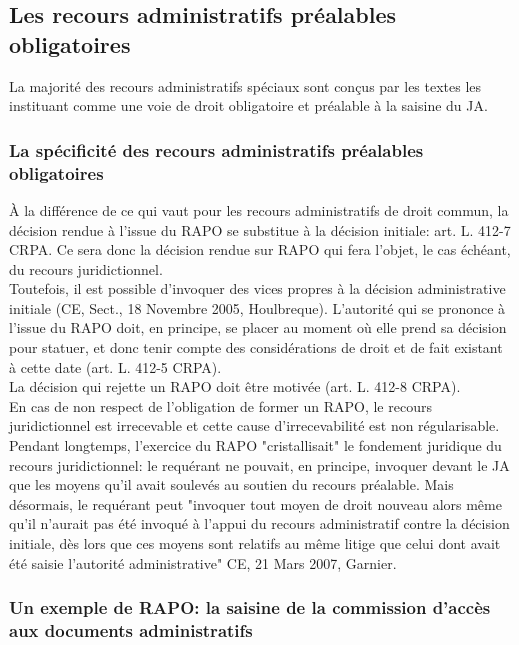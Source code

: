 \documentclass[10pt, a4paper, openany]{book}
\begin{document}
\subsection{Les recours administratifs préalables obligatoires}

La majorité des recours administratifs spéciaux sont conçus par les textes les instituant comme une voie de droit obligatoire et préalable à la saisine du JA. 

\subsubsection{La spécificité des recours administratifs préalables obligatoires}

À la différence de ce qui vaut pour les recours administratifs de droit commun, la décision rendue à l'issue du RAPO se substitue à la décision initiale: art. L. 412-7 CRPA. Ce sera donc la décision rendue sur RAPO qui fera l'objet, le cas échéant, du recours juridictionnel. \\
Toutefois, il est possible d'invoquer des vices propres à la décision administrative initiale (CE, Sect., 18 Novembre 2005, Houlbreque). L'autorité qui se prononce à l'issue du RAPO doit, en principe, se placer au moment où elle prend sa décision pour statuer, et donc tenir compte des considérations de droit et de fait existant à cette date (art. L. 412-5 CRPA). \\
La décision qui rejette un RAPO doit être motivée (art. L. 412-8 CRPA). \\
En cas de non respect de l'obligation de former un RAPO, le recours juridictionnel est irrecevable et cette cause d'irrecevabilité est non régularisable. \\
Pendant longtemps, l'exercice du RAPO "cristallisait" le fondement juridique du recours juridictionnel: le requérant ne pouvait, en principe, invoquer devant le JA que les moyens qu'il avait soulevés au soutien du recours préalable. Mais désormais, le requérant peut "invoquer tout moyen de droit nouveau alors même qu'il n'aurait pas été invoqué à l'appui du recours administratif contre la décision initiale, dès lors que ces moyens sont relatifs au même litige que celui dont avait été saisie l'autorité administrative" CE, 21 Mars 2007, Garnier. 

\subsubsection{Un exemple de RAPO: la saisine de la commission d'accès aux documents administratifs}
\end{document}
